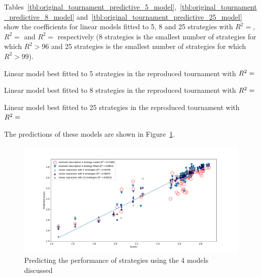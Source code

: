 \documentclass{article}
\begin{document}
Tables~\ref{tbl:original_tournament_predictive_5_model},~\ref{tbl:original_tournament_predictive_8_model}
and~\ref{tbl:original_tournament_predictive_25_model} show the coefficients for
linear models fitted to 5, 8 and 25 strategies with
\(R^2=\),
\(R^2=\) and
\(R^2=\)
respectively (8 strategies is the smallest number of strategies for which \(R^2
> 96\) and 25 strategies is the smallest number of strategies for which
\(R^2>99\)).


\begin{table}[!hbtp]
        \centering
        
        \caption{Linear model best fitted to 5 strategies in the reproduced tournament
                 with
             \(R^2=\protect\)}
        \label{tbl:original_tournament_predictive_5_model}
\end{table}

\begin{table}[!hbtp]
        \centering
        
        \caption{Linear model best fitted to 8 strategies in the reproduced tournament
                 with
             \(R^2=\protect\)}
        \label{tbl:original_tournament_predictive_8_model}
\end{table}

\begin{table}[!hbtp]
        \centering
        
        \caption{Linear model best fitted to 25 strategies in the reproduced tournament
                 with
             \(R^2=\protect\)}
        \label{tbl:original_tournament_predictive_25_model}
\end{table}

The predictions of these models are shown in
Figure~\ref{fig:original_tournament_predictive_score_models}.

\begin{figure}[!hbtp]
    \centering
    \includegraphics[width=.9\textwidth]{assets/original_tournament_predictive_score_models.pdf}
    \caption{Predicting the performance of strategies using the 4 models
             discussed}
    \label{fig:original_tournament_predictive_score_models}
\end{figure}
\end{document}
